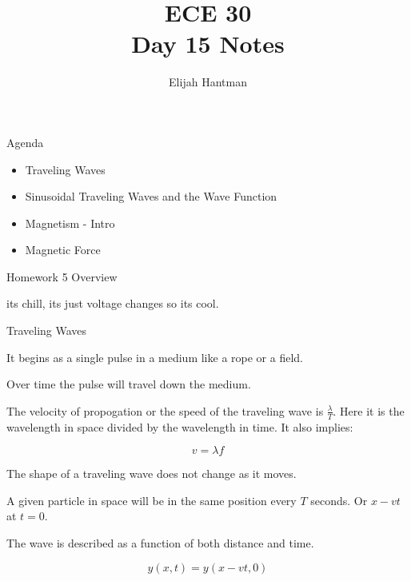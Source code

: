 \documentclass{report}
\title{\Huge{ECE 30}\\Day 15 Notes}
\author{\huge{Elijah Hantman}}
\date{}
\begin{document}
\maketitle
\newpage

\begin{description}
    \item {\large Agenda} 
        \begin{mdframed}
            \begin{itemize}
                \item Traveling Waves
                \item Sinusoidal Traveling Waves and the Wave Function
                \item Magnetism - Intro
                \item Magnetic Force
            \end{itemize}
        \end{mdframed}
    \item Homework 5 Overview
        \begin{mdframed}
            its chill, its just voltage changes so its cool. 
        \end{mdframed}
    \item {\large Traveling Waves}
        \begin{mdframed}
            It begins as a single pulse in a medium like
            a rope or a field.

            Over time the pulse will travel down
            the medium.

            The velocity of propogation or the speed of the
            traveling wave is $\frac{\lambda}{T}$. Here it
            is the wavelength in space divided by the wavelength
            in time. It also implies:

            \begin{displaymath}
                v = \lambda f
            \end{displaymath}

            The shape of a traveling wave does not change as it
            moves.

            A given particle in space will be in the same position
            every $T$ seconds. Or  $x - vt$ at  $t = 0$.
            
            The wave is described as a function of both distance and
            time.

            \begin{displaymath}
                y(x,t) = y(x-vt, 0)
            \end{displaymath}
            

\end{mdframed}
\end{description}
\end{document}
